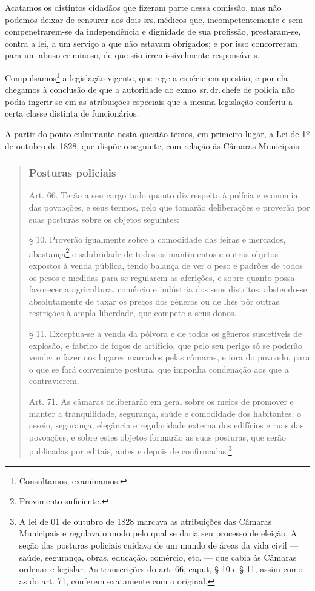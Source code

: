 Acatamos os distintos cidadãos que fizeram parte dessa comissão, mas não
podemos deixar de censurar aos dois srs.\,médicos que, incompetentemente
e sem compenetrarem-se da independência e dignidade de sua profissão,
prestaram-se, contra a lei, a um serviço a que não estavam obrigados; e
por isso concorreram para um abuso criminoso, de que são
irremissivelmente responsáveis.

Compulsamos\footnote{Consultamos, examinamos.} a legislação vigente,
que rege a espécie em questão, e por ela chegamos à conclusão de que a
autoridade do exmo.\,sr.\,dr.\,chefe de polícia não podia ingerir-se em as
atribuições especiais que a mesma legislação conferiu a certa classe
distinta de funcionários.

A partir do ponto culminante nesta questão temos, em primeiro lugar, a
Lei de 1º de outubro de 1828, que dispõe o seguinte, com relação às
Câmaras Municipais:

\begin{quote}
\subsubsection{Posturas policiais}

Art. 66. Terão a seu cargo tudo quanto diz respeito à polícia e economia
das povoações, e seus termos, pelo que tomarão deliberações e proverão
por suas posturas sobre os objetos seguintes:

\noindent\dotfill

§ 10. Proverão igualmente sobre a comodidade das feiras e mercados,
abastança\footnote{Provimento suficiente.} e salubridade de todos os
mantimentos e outros objetos expostos à venda pública, tendo balança de
ver o peso e padrões de todos os pesos e medidas para se regularem as
aferições, e sobre quanto possa favorecer a agricultura, comércio e
indústria dos seus distritos, abstendo-se absolutamente de taxar os
preços dos gêneros ou de lhes pôr outras restrições à ampla liberdade,
que compete a seus donos.

§ 11. Exceptua-se a venda da pólvora e de todos os gêneros suscetíveis
de explosão, e fabrico de fogos de artifício, que pelo seu perigo só se
poderão vender e fazer nos lugares marcados pelas câmaras, e fora do
povoado, para o que se fará conveniente postura, que imponha condenação
aos que a contravierem.

Art. 71. As câmaras deliberarão em geral sobre os meios de promover e
manter a tranquilidade, segurança, saúde e comodidade dos habitantes; o
asseio, segurança, elegância e regularidade externa dos edifícios e ruas
das povoações, e sobre estes objetos formarão as suas posturas, que
serão publicadas por editais, antes e depois de confirmadas.\footnote{
  A lei de 01 de outubro de 1828 marcava as atribuições das Câmaras Municipais e
  regulava o modo pelo qual se daria seu processo de eleição. A seção
  das posturas policiais cuidava de um mundo de áreas da vida civil ---
  saúde, segurança, obras, educação, comércio, etc. --- que cabia às
  Câmaras ordenar e legislar. As transcrições do art. 66, caput, § 10 e
  § 11, assim como as do art. 71, conferem exatamente com o original.}
\end{quote}

